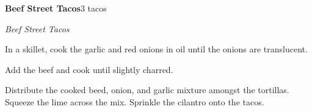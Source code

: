 \documentclass[../recipe-collections/cooking.tex]{subfiles}
\begin{document}
\begin{recipe}{\textbf{Beef Street Tacos}}{3 tacos}{}

  \freeform{}\textit{Beef Street Tacos}


  In a skillet, cook the garlic and red onions in oil until the onions are
  translucent. 


  Add the beef and cook until slightly charred.


  Distribute the cooked beed, onion, and garlic mixture amongst the tortillas.
  Squeeze the lime across the mix. Sprinkle the cilantro onto the tacos.
  
  \freeform{}\hrulefill{}

\end{recipe}
\end{document}
